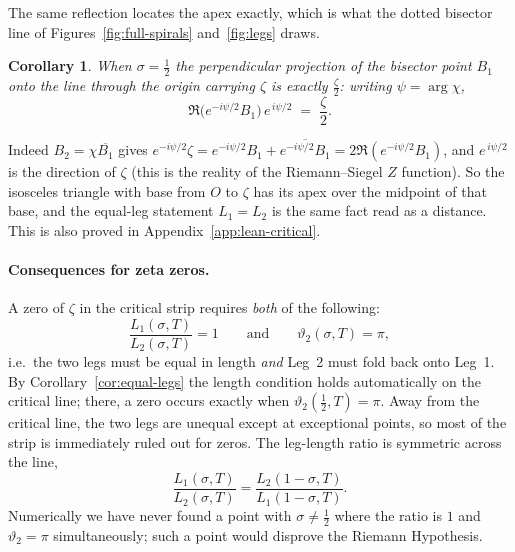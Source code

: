 \documentclass[11pt]{article}
\newtheorem{corollary}[theorem]{Corollary}
\theoremstyle{definition}
\begin{document}
The same reflection locates the apex exactly, which is what the dotted bisector
line of Figures~\ref{fig:full-spirals} and~\ref{fig:legs} draws.

\begin{corollary}\label{cor:bisector-proj}
When $\sigma=\tfrac12$ the perpendicular projection of the bisector point $B_1$
onto the line through the origin carrying $\zeta$ is exactly $\tfrac{\zeta}{2}$:
writing $\psi=\arg\chi$,
\begin{equation}\label{eq:bisector-proj}
\Re\!\bigl(e^{-i\psi/2}B_1\bigr)\,e^{\,i\psi/2}\;=\;\frac{\zeta}{2}.
\end{equation}
\end{corollary}

Indeed $B_2=\chi\overline{B_1}$ gives
$e^{-i\psi/2}\zeta=e^{-i\psi/2}B_1+\overline{e^{-i\psi/2}B_1}
=2\Re(e^{-i\psi/2}B_1)$, and $e^{\,i\psi/2}$ is the direction of $\zeta$ (this is
the reality of the Riemann--Siegel $Z$ function). So the isosceles triangle with
base from $O$ to $\zeta$ has its apex over the midpoint of that base, and the
equal-leg statement $L_1=L_2$ is the same fact read as a distance. This is also
proved in Appendix~\ref{app:lean-critical}.

\paragraph{Consequences for zeta zeros.} A zero of $\zeta$ in the critical strip
requires \emph{both} of the following:
\[
\frac{L_{1}(\sigma,T)}{L_{2}(\sigma,T)} = 1
\qquad\text{and}\qquad
\vartheta_2(\sigma,T) = \pi,
\]
i.e.\ the two legs must be equal in length \emph{and} Leg~2 must fold back onto
Leg~1. By Corollary~\ref{cor:equal-legs} the length condition holds automatically on
the critical line; there, a zero occurs exactly when $\vartheta_2(\tfrac12,T) =
\pi$. Away from the critical line, the two legs are unequal except at
exceptional points, so most of the strip is immediately ruled out for zeros. The leg-length ratio is symmetric across the
line,
\begin{equation}
\frac{L_{1}(\sigma,T)}{L_{2}(\sigma,T)}
=
\frac{L_{2}(1-\sigma,T)}{L_{1}(1-\sigma,T)} .
\end{equation}
Numerically we have never found a point with $\sigma\neq\tfrac12$ where the
ratio is $1$ and $\vartheta_2=\pi$ simultaneously; such a point would disprove
the Riemann Hypothesis.
\end{document}
